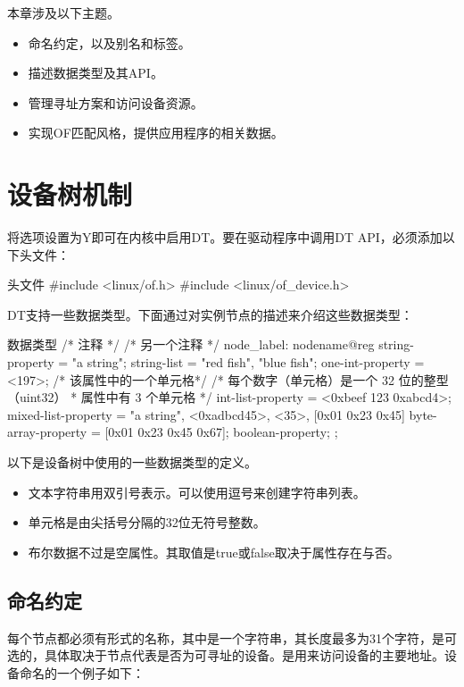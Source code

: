 \documentclass[lang=cn,newtx,10pt,scheme=chinese]{elegantbook}
\begin{document}
本章涉及以下主题。

\begin{itemize}
\item 命名约定，以及别名和标签。
\item 描述数据类型及其API。
\item 管理寻址方案和访问设备资源。
\item 实现OF匹配风格，提供应用程序的相关数据。
\end{itemize}

\section{设备树机制}

将选项设置为Y即可在内核中启用DT。要在驱动程序中调用DT API，必须添加以下头文件：

\begin{mycode}{头文件}
#include <linux/of.h>
#include <linux/of_device.h>
\end{mycode}

DT支持一些数据类型。下面通过对实例节点的描述来介绍这些数据类型：

\begin{mycode}{数据类型}
/* 注释 */
/* 另一个注释 */
node_label: nodename@reg{
    string-property = "a string";
    string-list = "red fish", "blue fish";
    one-int-property = <197>; /* 该属性中的一个单元格*/
    /* 每个数字（单元格）是一个 32 位的整型（uint32）
     * 属性中有 3 个单元格
     */
    int-list-property = <0xbeef 123 0xabcd4>;
    mixed-list-property = "a string", <0xadbcd45>, <35>, [0x01 0x23 0x45]
    byte-array-property = [0x01 0x23 0x45 0x67];
    boolean-property;
};
\end{mycode}

以下是设备树中使用的一些数据类型的定义。

\begin{itemize}
\item 文本字符串用双引号表示。可以使用逗号来创建字符串列表。
\item 单元格是由尖括号分隔的32位无符号整数。
\item 布尔数据不过是空属性。其取值是true或false取决于属性存在与否。
\end{itemize}

\subsection{命名约定}

每个节点都必须有形式的名称，其中是一个字符串，其长度最多为31个字符，是可选的，具体取决于节点代表是否为可寻址的设备。是用来访问设备的主要地址。设备命名的一个例子如下：
\end{document}

